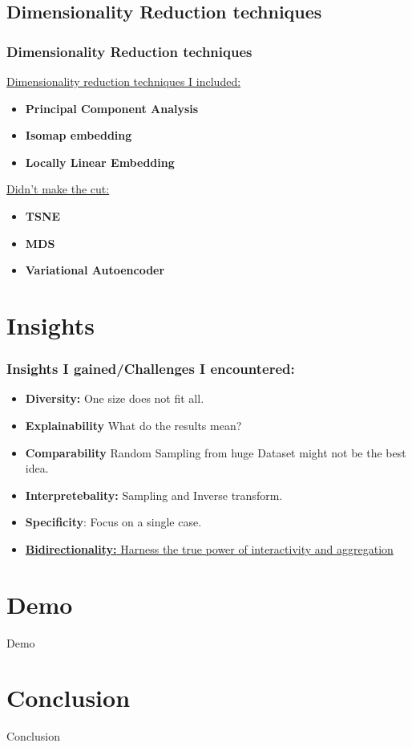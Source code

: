 \documentclass[aspectratio=1610]{beamer}
\begin{document}
\subsection {Dimensionality Reduction techniques}
\begin{frame}
  \frametitle{Dimensionality Reduction techniques}

  \large{\underline{Dimensionality reduction techniques I included:}}
  \begin{itemize}
    \item \textbf{Principal Component Analysis} 
    \item \textbf{Isomap embedding}       
    \item \textbf{Locally Linear Embedding}    
  \end{itemize}
  \large{\underline{Didn't make the cut:}}
  \begin{itemize}
    \item \textbf{TSNE} 
    \item \textbf{MDS}       
    \item \textbf{Variational Autoencoder}    
  \end{itemize}
\end{frame}

\section {Insights}
\begin{frame}
  \frametitle{Insights I gained/Challenges I encountered:}
  \begin{itemize}
    \item \textbf{Diversity:} One size does not fit all.
    \item \textbf{Explainability} What do the results mean?
    \item \textbf{Comparability} Random Sampling from huge Dataset might not be the best idea.
    \item \textbf{Interpretebality:} Sampling and Inverse transform. 
    \item \textbf{Specificity}: Focus on a single case.
    \item \underline{\textbf{Bidirectionality:} Harness the true power of interactivity and aggregation}      
  \end{itemize}
\end{frame}

\section {Demo}
\begin{frame}
    \begin{centering}
      \huge{Demo}
    \end{centering}
\end{frame}

\section {Conclusion}
\begin{frame}
    \begin{centering}
      \huge{Conclusion}
    \end{centering}
\end{frame}
\end{document}
